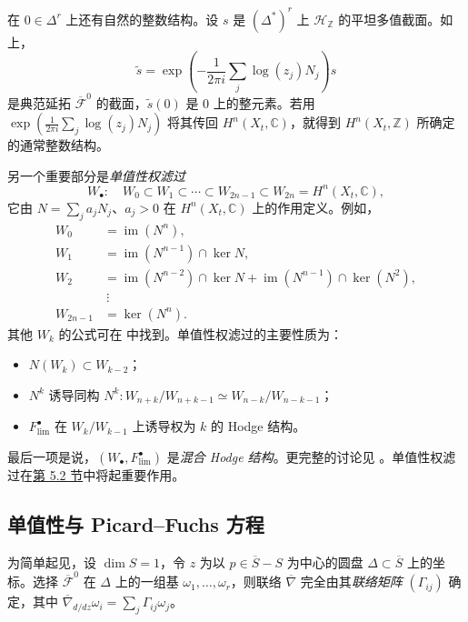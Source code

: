 在 $0\in\Delta^r$ 上还有自然的整数结构。设 $s$ 是 $(\Delta^*)^r$ 上 $\mathcal H_{\mathbb Z}$ 的平坦多值截面。如上，
\[
\widetilde s=\exp\left(-\frac1{2\pi i}\sum_j\log(z_j)N_j\right)s
\]
是典范延拓 $\overline{\mathcal F}^0$ 的截面，$\widetilde s(0)$ 是 $0$ 上的整元素。若用 $\exp(\tfrac1{2\pi i}\sum_j\log(z_j)N_j)$ 将其传回 $H^n(X_t,\mathbb C)$，就得到 $H^n(X_t,\mathbb Z)$ 所确定的通常整数结构。

另一个重要部分是\emph{单值性权滤过}
\[
W_\bullet:\quad W_0\subset W_1\subset\cdots\subset W_{2n-1}
\subset W_{2n}=H^n(X_t,\mathbb C),
\]
它由 $N=\sum_j a_jN_j$、$a_j>0$ 在 $H^n(X_t,\mathbb C)$ 上的作用定义。例如，
\begin{equation}\label{eq:monodromy-weight-filtration}
\begin{aligned}
W_0&=\operatorname{im}(N^n),\\
W_1&=\operatorname{im}(N^{n-1})\cap\ker N,\\
W_2&=\operatorname{im}(N^{n-2})\cap\ker N
+\operatorname{im}(N^{n-1})\cap\ker(N^2),\\
&\ \vdots\\
W_{2n-1}&=\ker(N^n).
\end{aligned}
\end{equation}
其他 $W_k$ 的公式可在  中找到。单值性权滤过的主要性质为：
\begin{itemize}
\item $N(W_k)\subset W_{k-2}$；
\item $N^k$ 诱导同构
$N^k:W_{n+k}/W_{n+k-1}\simeq W_{n-k}/W_{n-k-1}$；
\item $F_{\mathrm{lim}}^\bullet$ 在 $W_k/W_{k-1}$ 上诱导权为 $k$ 的 Hodge 结构。
\end{itemize}
最后一项是说，$(W_\bullet,F_{\mathrm{lim}}^\bullet)$ 是\emph{混合 Hodge 结构}。更完整的讨论见 。单值性权滤过在\hyperref[sec:maximal-unipotent]{第 5.2 节}中将起重要作用。

\subsection{单值性与 Picard--Fuchs 方程}\label{subsec:monodromy-pf}

为简单起见，设 $\dim S=1$，令 $z$ 为以 $p\in\overline S-S$ 为中心的圆盘 $\Delta\subset\overline S$ 上的坐标。选择 $\overline{\mathcal F}^0$ 在 $\Delta$ 上的一组基 $\omega_1,\ldots,\omega_r$，则联络 $\overline\nabla$ 完全由其\emph{联络矩阵} $(\Gamma_{ij})$ 确定，其中 $\overline\nabla_{d/dz}\omega_i=\sum_j\Gamma_{ij}\omega_j$。

